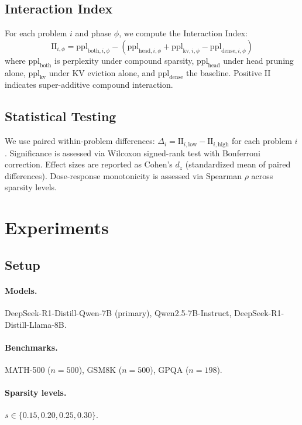 \documentclass[11pt,a4paper]{article}
\begin{document}
\subsection{Interaction Index}

For each problem $i$ and phase $\phi$, we compute the Interaction Index:
\begin{equation}
    \text{II}_{i,\phi} = \text{ppl}_{\text{both},i,\phi} - (\text{ppl}_{\text{head},i,\phi} + \text{ppl}_{\text{kv},i,\phi} - \text{ppl}_{\text{dense},i,\phi})
\end{equation}
where $\text{ppl}_{\text{both}}$ is perplexity under compound sparsity, $\text{ppl}_{\text{head}}$ under head pruning alone, $\text{ppl}_{\text{kv}}$ under KV eviction alone, and $\text{ppl}_{\text{dense}}$ the baseline. Positive II indicates super-additive compound interaction.

\subsection{Statistical Testing}

We use paired within-problem differences: $\Delta_i = \text{II}_{i,\text{low}} - \text{II}_{i,\text{high}}$ for each problem $i$. Significance is assessed via Wilcoxon signed-rank test with Bonferroni correction. Effect sizes are reported as Cohen's $d_z$ (standardized mean of paired differences). Dose-response monotonicity is assessed via Spearman $\rho$ across sparsity levels.

\section{Experiments}

\subsection{Setup}

\paragraph{Models.} DeepSeek-R1-Distill-Qwen-7B (primary), Qwen2.5-7B-Instruct, DeepSeek-R1-Distill-Llama-8B.

\paragraph{Benchmarks.} MATH-500 ($n=500$), GSM8K ($n=500$), GPQA ($n=198$).

\paragraph{Sparsity levels.} $s \in \{0.15, 0.20, 0.25, 0.30\}$.
\end{document}
